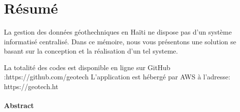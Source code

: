 \section{Résumé}
\paragraph{}
La gestion des données géothechniques en Haïti ne dispose pas d’un système informatisé centralisé. Dans ce mémoire, nous vous présentons une solution se basant sur la conception et la réalisation d'un tel systeme.\par 

La totalité des codes est disponible en ligne sur GitHub :https://github.com/geotech
L’application est hébergé par AWS à l’adresse: https://geotech.ht

\paragraph{Abstract}
\par 
\lipsum[1-2]